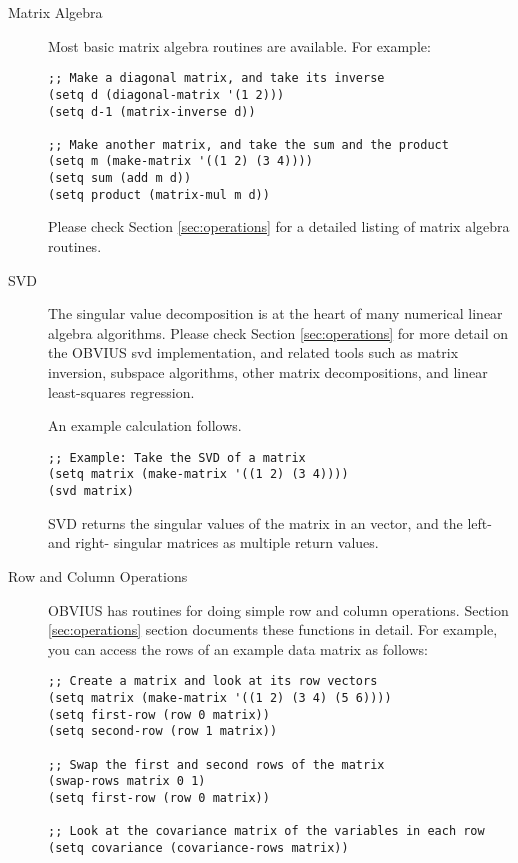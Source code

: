 \begin{description}
\item[Matrix Algebra]
Most basic matrix algebra routines are available. For example:

\begin{verbatim}
;; Make a diagonal matrix, and take its inverse
(setq d (diagonal-matrix '(1 2)))
(setq d-1 (matrix-inverse d))

;; Make another matrix, and take the sum and the product
(setq m (make-matrix '((1 2) (3 4))))
(setq sum (add m d))
(setq product (matrix-mul m d))
\end{verbatim}

Please check Section \ref{sec:operations} for a detailed listing of
matrix algebra routines.

\item[SVD] The singular value decomposition is at the heart of many
numerical linear algebra algorithms.  Please check Section
\ref{sec:operations} for more detail on the OBVIUS svd implementation,
and related tools such as matrix inversion, subspace algorithms, other
matrix decompositions, and linear least-squares regression.

An example calculation follows.

\begin{verbatim}
;; Example: Take the SVD of a matrix
(setq matrix (make-matrix '((1 2) (3 4))))
(svd matrix)
\end{verbatim}

SVD returns the singular values of the matrix in an vector,
and the left- and right- singular matrices as multiple return values.

\item[Row and Column Operations]
OBVIUS has routines for doing simple row and column operations.
Section \ref{sec:operations} section documents these functions in
detail.  For example, you can access the rows of an example data
matrix as follows:

\begin{verbatim}
;; Create a matrix and look at its row vectors
(setq matrix (make-matrix '((1 2) (3 4) (5 6))))
(setq first-row (row 0 matrix))
(setq second-row (row 1 matrix))

;; Swap the first and second rows of the matrix
(swap-rows matrix 0 1)
(setq first-row (row 0 matrix))

;; Look at the covariance matrix of the variables in each row
(setq covariance (covariance-rows matrix))
\end{verbatim}

\end{description}



